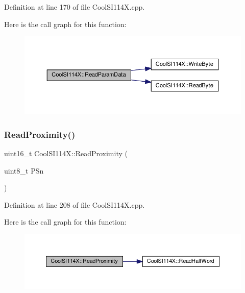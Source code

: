 Definition at line 170 of file Cool\+S\+I114\+X.\+cpp.

Here is the call graph for this function\+:
\nopagebreak
\begin{figure}[H]
\begin{center}
\leavevmode
\includegraphics[width=350pt]{class_cool_s_i114_x_a33cf431103c722442f6a0cc93848d640_cgraph}
\end{center}
\end{figure}
\mbox{\label{class_cool_s_i114_x_a194fede1105508c7803dbb567cbdcc67}} 
\subsubsection{\texorpdfstring{Read\+Proximity()}{ReadProximity()}}
{\footnotesize\ttfamily uint16\+\_\+t Cool\+S\+I114\+X\+::\+Read\+Proximity (\begin{DoxyParamCaption}\item[{uint8\+\_\+t}]{P\+Sn }\end{DoxyParamCaption})}



Definition at line 208 of file Cool\+S\+I114\+X.\+cpp.

Here is the call graph for this function\+:
\nopagebreak
\begin{figure}[H]
\begin{center}
\leavevmode
\includegraphics[width=350pt]{class_cool_s_i114_x_a194fede1105508c7803dbb567cbdcc67_cgraph}
\end{center}
\end{figure}
\mbox{\label{class_cool_s_i114_x_a869d3825147831d707f7ef324a665646}} 
